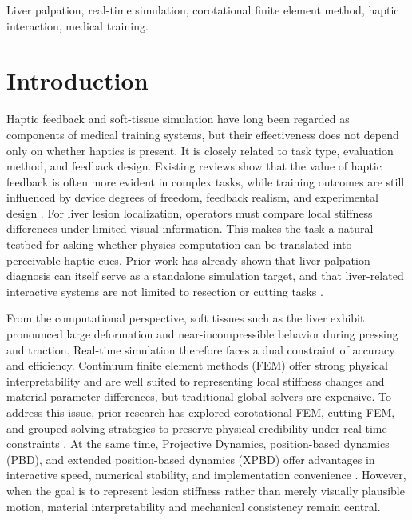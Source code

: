 \documentclass{ieeeaccess}
\begin{document}
\begin{keywords}
Liver palpation, real-time simulation, corotational finite element method, haptic interaction, medical training.
\end{keywords}

\titlepgskip=-21pt
\maketitle

\section{Introduction}
Haptic feedback and soft-tissue simulation have long been regarded as components of medical training systems, but their effectiveness does not depend only on whether haptics is present. It is closely related to task type, evaluation method, and feedback design. Existing reviews show that the value of haptic feedback is often more evident in complex tasks, while training outcomes are still influenced by device degrees of freedom, feedback realism, and experimental design \cite{overtoom2019haptic,rangarajan2020systematic,escobar2016review}. For liver lesion localization, operators must compare local stiffness differences under limited visual information. This makes the task a natural testbed for asking whether physics computation can be translated into perceivable haptic cues. Prior work has already shown that liver palpation diagnosis can itself serve as a standalone simulation target, and that liver-related interactive systems are not limited to resection or cutting tasks \cite{westwood2012haptic,hongyu2021interactive}.

From the computational perspective, soft tissues such as the liver exhibit pronounced large deformation and near-incompressible behavior during pressing and traction. Real-time simulation therefore faces a dual constraint of accuracy and efficiency. Continuum finite element methods (FEM) offer strong physical interpretability and are well suited to representing local stiffness changes and material-parameter differences, but traditional global solvers are expensive. To address this issue, prior research has explored corotational FEM, cutting FEM, and grouped solving strategies to preserve physical credibility under real-time constraints \cite{bui2019corotational,wang2025group}. At the same time, Projective Dynamics, position-based dynamics (PBD), and extended position-based dynamics (XPBD) offer advantages in interactive speed, numerical stability, and implementation convenience \cite{bouaziz2023projective,liu2016towards,bender2014survey,muller2007position,macklin2016xpbd}. However, when the goal is to represent lesion stiffness rather than merely visually plausible motion, material interpretability and mechanical consistency remain central.
\end{document}
